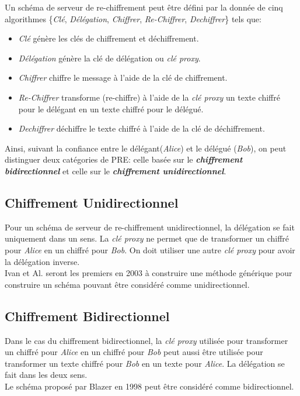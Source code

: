 \documentclass[twoside,french,11pt]{amsart}
\begin{document}
Un schéma de serveur de re-chiffrement peut être défini par la donnée de cinq algorithmes \{\textit{Clé}, \textit{Délégation}, \textit{Chiffrer}, \textit{Re-Chiffrer}, \textit{Dechiffrer}\} tels que:
\begin{itemize}
	\item \textit{Clé} génère les clés de chiffrement et déchiffrement.
	\item \textit{Délégation} génère la clé de délégation ou \textit{clé proxy}.
	\item \textit{Chiffrer} chiffre le message à l'aide de la clé de chiffrement.
	\item \textit{Re-Chiffrer} transforme (re-chiffre) à l'aide de la \textit{clé proxy} un texte chiffré pour le délégant en un texte chiffré pour le délégué.
	\item  \textit{Dechiffrer} déchiffre le texte chiffré à l'aide de la clé de déchiffrement.
\end{itemize}
Ainsi, suivant la confiance entre le délégant(\textit{Alice}) et le délégué (\textit{Bob}), on peut distinguer deux catégories de PRE: celle basée sur le \textbf{\textit{chiffrement bidirectionnel}} et celle sur le \textbf{\textit{chiffrement unidirectionnel}}.

\subsection{Chiffrement Unidirectionnel}
Pour un schéma de serveur de re-chiffrement unidirectionnel, la délégation se fait uniquement dans un sens. La \textit{clé proxy} ne permet que de transformer un chiffré pour \textit{Alice} en un chiffré pour \textit{Bob}. On doit utiliser une autre \textit{clé proxy} pour avoir la délégation inverse.  \\ Ivan et Al. \cite{ivan2003proxy} seront les premiers en 2003 à construire une méthode générique pour construire un schéma pouvant être considéré comme unidirectionnel.

\subsection{Chiffrement Bidirectionnel}
Dans le cas du chiffrement bidirectionnel, la \textit{clé proxy} utilisée pour transformer un chiffré pour \textit{Alice} en un chiffré pour \textit{Bob} peut aussi être utilisée pour transformer un texte chiffré pour \textit{Bob} en un texte pour \textit{Alice}. La délégation se fait dans les deux sens.\\
Le schéma proposé par Blazer en 1998 peut être considéré comme bidirectionnel.
\end{document}
